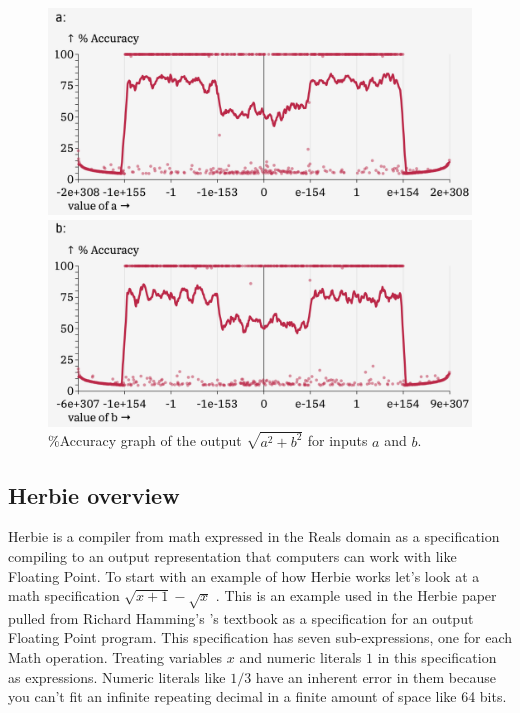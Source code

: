 \documentclass{article}
\begin{document}
\begin{figure}[ht]
\centering
\begin{minipage}{0.45\textwidth}
  \includegraphics[width=\textwidth]{hypot-error-a.png}
\end{minipage}
\hfill
\begin{minipage}{0.45\textwidth}
  \includegraphics[width=\textwidth]{hypot-error-b.png}
\end{minipage}
\caption{\%Accuracy graph of the output $\sqrt{a^2 + b^2}$ for inputs $a$ and $b$.}
\label{fig:hypot-error-graph}
\end{figure}

\subsection{Herbie overview}


Herbie is a compiler from math expressed in the Reals domain as a specification compiling to an output representation that computers can work with like Floating Point. To start with an example of how Herbie works let's look at a math specification $\sqrt{x + 1} - \sqrt{x}$ . This is an example used in the Herbie paper pulled from Richard Hamming's \cite{Hamming}'s textbook as a specification for an output Floating Point program. This specification has seven sub-expressions, one for each Math operation. Treating variables $x$ and numeric literals $1$ in this specification as expressions. Numeric literals like $1/3$ have an inherent error in them because you can't fit an infinite repeating decimal in a finite amount of space like 64 bits. 
\end{document}

